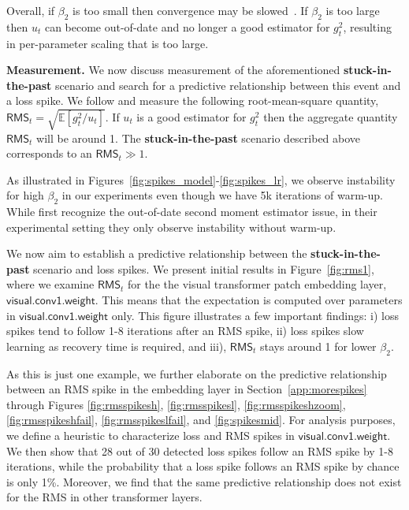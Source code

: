 Overall, if $\beta_2$ is too small then convergence may be slowed~\cite{reddi2019convergence}. If $\beta_2$ is too large then $u_t$ can become out-of-date and no longer a good estimator for $g_t^2$, resulting in per-parameter scaling that is too large.

\textbf{Measurement.}
We now discuss measurement of the aforementioned \textbf{stuck-in-the-past} scenario and search for a predictive relationship between this event and a loss spike. We follow \citet{shazeer2018adafactor} and measure the following root-mean-square quantity, $\mathsf{RMS}_t = \sqrt{ \mathds{E}  \left[ g_t^2 / u_t \right] }$. If $u_t$ is a good estimator for $g_t^2$ then the aggregate quantity $\mathsf{RMS}_t$ will be around 1. The \textbf{stuck-in-the-past} scenario described above corresponds to an $\mathsf{RMS}_t \gg 1$.

As illustrated in Figures~\ref{fig:spikes_model}-\ref{fig:spikes_lr}, we observe instability for high $\beta_2$ in our experiments even though we have 5k iterations of warm-up. While \citet{shazeer2018adafactor} first recognize the out-of-date second moment estimator issue, in their experimental setting they only observe instability without warm-up.

We now aim to establish a predictive relationship between the \textbf{stuck-in-the-past} scenario and loss spikes. We present initial results in Figure~\ref{fig:rms1}, where we examine $\mathsf{RMS}_t$ for the the visual transformer patch embedding layer, $\mathsf{visual.conv1.weight}$.
This means that the expectation is computed over parameters in $\mathsf{visual.conv1.weight}$ only. This figure illustrates a few important findings: i) loss spikes tend to follow 1-8 iterations after an RMS spike, ii) loss spikes slow learning as recovery time is required, and iii), $\mathsf{RMS}_t$ stays around 1 for lower $\beta_2$.

As this is just one example, we further elaborate on the predictive relationship between an RMS spike in the embedding layer in Section~\ref{app:morespikes} through Figures
\ref{fig:rmsspikesh},
\ref{fig:rmsspikesl},
\ref{fig:rmsspikeshzoom},
\ref{fig:rmsspikeshfail},
\ref{fig:rmsspikeslfail}, and
\ref{fig:spikesmid}.
For analysis purposes, we define a heuristic to characterize loss and RMS spikes in $\mathsf{visual.conv1.weight}$.
We then show that 28 out of 30 detected loss spikes follow an RMS spike by 1-8 iterations, while the probability that a loss spike follows an RMS spike by chance is only 1\%.
Moreover, we find that the same predictive relationship does not exist for the RMS in other transformer layers.

